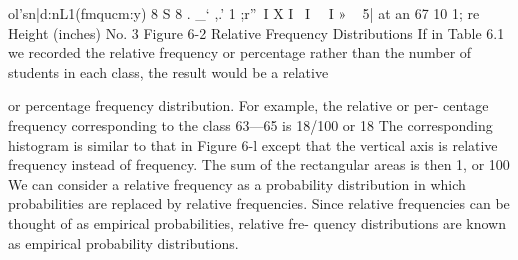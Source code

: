 ol'sn|d:nL1(fmqucm:y)
8 S 8
. _‘
,.’
1
;r”\
I X
I \
I
\
\
I
» ~
5| at an 67 10 1; re
Height (inches)
No.
3
Figure 6-2
Relative Frequency Distributions
If in Table 6.1 we recorded the relative frequency or percentage rather
than the number of students in each class, the result would be a relative

or percentage frequency distribution. For example, the relative or per-
centage frequency corresponding to the class 63—65 is 18/100 or 18%
The corresponding histogram is similar to that in Figure 6-l except that
the vertical axis is relative frequency instead of frequency. The sum of
the rectangular areas is then 1, or 100%
We can consider a relative frequency as a probability distribution in
which probabilities are replaced by relative frequencies. Since relative
frequencies can be thought of as empirical probabilities, relative fre-
quency distributions are known as empirical probability distributions.



